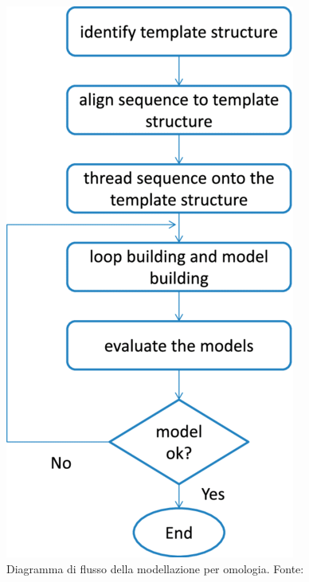 {	\begin{figure}[!htb]
		\includegraphics[scale=0.43]{images/homology1.png}
		\caption{Diagramma di flusso della modellazione per omologia. Fonte: \cite{sliwoski2014computational}}
		\label{fig:omologia-flusso}
		\endminipage\hfill
		\centering

\end{figure}}
